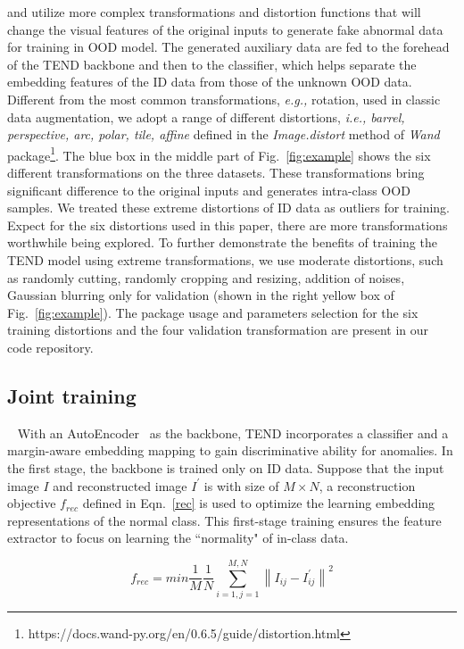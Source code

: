\documentclass[12pt]{spieman}  %
\begin{document}
\begin{spacing}{2}
and utilize more complex transformations and distortion functions that will change the visual features of the original inputs to generate fake abnormal data for training in OOD model. The generated auxiliary data are fed to the forehead of the TEND backbone and then to the classifier, which helps separate the embedding features of the ID data from those of the unknown OOD data. Different from the most common transformations, \textit{e.g.,} rotation, used in classic data augmentation, we adopt a range of different distortions, \textit{i.e., barrel, perspective, arc, polar, tile, affine} defined in the \textit{Image.distort} method of \textit{Wand} package\footnote{https://docs.wand-py.org/en/0.6.5/guide/distortion.html}. The blue box in the middle part of Fig.~\ref{fig:example} shows the six different transformations on the three datasets. These transformations bring significant difference to the original inputs and generates intra-class OOD samples. We treated these extreme distortions of ID data as outliers for training. Expect for the six distortions used in this paper, there are more transformations worthwhile being explored. To further demonstrate the benefits of training the TEND model using extreme transformations, we use moderate distortions, such as randomly cutting, randomly cropping and resizing, addition of noises, Gaussian blurring only for validation (shown in the right yellow box of Fig.~\ref{fig:example}). The package usage and parameters selection for the six training distortions and the four validation transformation are present in our code repository. 


\subsection{Joint training}~\label{jointraining}
With an AutoEncoder~\cite{mcclelland1986parallel} as the backbone, TEND incorporates a classifier and a margin-aware embedding mapping to gain discriminative ability for anomalies. 
In the first stage, the backbone is trained only on ID data. Suppose that the input image $I$ and reconstructed image $I^{'}$ is with size of $M\times N$, a reconstruction objective $f_{rec}$ defined in Eqn.~\ref{rec} is used to optimize the learning embedding representations of the normal class. This first-stage training ensures the feature extractor to focus on learning the ``normality" of in-class data. 

\begin{equation}\label{rec}
f_{rec}=min\frac{1}{M}\frac{1}{N}\sum_{i=1,j=1}^{M,N}\left \|I_{ij}-I^{'}_{ij}  \right \|^{2}
\end{equation}


\end{spacing}
\end{document}
